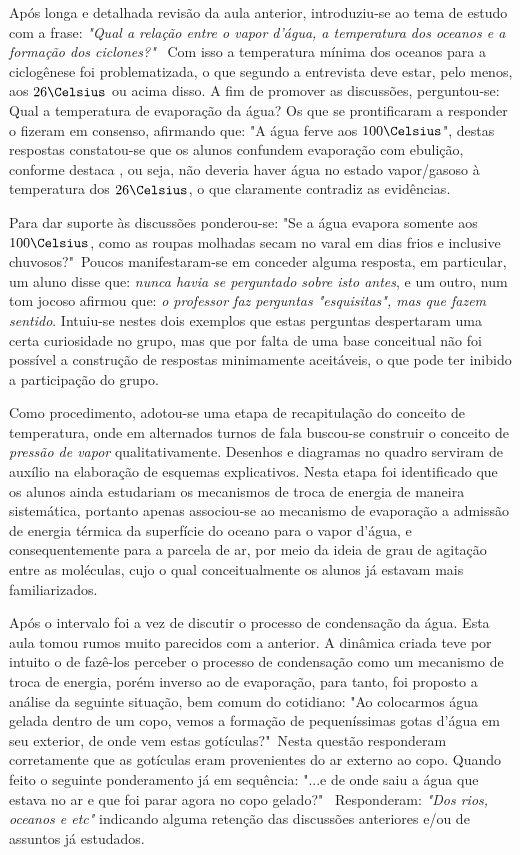 Após longa e detalhada revisão da aula anterior, introduziu-se ao tema de estudo com a frase: \textit{"Qual a relação entre o vapor d'água, a temperatura dos oceanos e a formação dos ciclones?"}~ Com isso a temperatura mínima dos oceanos para a ciclogênese foi problematizada, o que segundo a entrevista deve estar, pelo menos, aos $26\Celsius$ ou acima disso. A fim de promover as discussões, perguntou-se: Qual a temperatura de evaporação da água? Os que se prontificaram a responder o fizeram em consenso, afirmando que: "A água ferve aos $100\Celsius$", destas respostas constatou-se que os alunos confundem evaporação com ebulição, conforme destaca \cite{LANG:2016}, ou seja, não deveria haver água no estado vapor/gasoso à temperatura dos $26\Celsius$, o que claramente contradiz as evidências.

Para dar suporte às discussões ponderou-se: "Se a água evapora somente aos $100\Celsius$, como as roupas molhadas secam no varal em dias frios e inclusive chuvosos?"~Poucos manifestaram-se em conceder alguma resposta, em particular, um aluno disse que: \textit{nunca havia se perguntado sobre isto antes}, e um outro, num tom jocoso afirmou que: \textit{o professor faz perguntas "esquisitas", mas que fazem sentido}. Intuiu-se nestes dois exemplos que estas perguntas despertaram uma certa curiosidade no grupo, mas que por falta de uma base conceitual não foi possível a construção de respostas minimamente aceitáveis, o que pode ter inibido a participação do grupo.

Como procedimento, adotou-se uma etapa de recapitulação do conceito de temperatura, onde em alternados turnos de fala buscou-se construir o conceito de \textit{pressão de vapor} qualitativamente. Desenhos e diagramas no quadro serviram de auxílio na elaboração de esquemas explicativos. Nesta etapa foi identificado que os alunos ainda estudariam os mecanismos de troca de energia de maneira sistemática, portanto apenas associou-se ao mecanismo de evaporação a admissão de energia térmica da superfície do oceano para o vapor d'água, e consequentemente para a parcela de ar, por meio da ideia de grau de agitação entre as moléculas, cujo o qual conceitualmente os alunos já estavam mais familiarizados. 

Após o intervalo foi a vez de discutir o processo de condensação da água. Esta aula tomou rumos muito parecidos com a anterior. A dinâmica criada teve por intuito o de fazê-los perceber o processo de condensação como um mecanismo de troca de energia, porém inverso ao de evaporação, para tanto, foi proposto a análise da seguinte situação, bem comum do cotidiano: "Ao colocarmos água gelada dentro de um copo, vemos a formação de pequeníssimas gotas d'água em seu exterior, de onde vem estas gotículas?"~Nesta questão responderam corretamente que as gotículas eram provenientes do ar externo ao copo. Quando feito o seguinte ponderamento já em sequência: "...e de onde saiu a água que estava no ar e que foi parar agora no copo gelado?"~ Responderam: \textit{"Dos rios, oceanos e etc"} indicando alguma retenção das discussões anteriores e/ou de assuntos já estudados.

